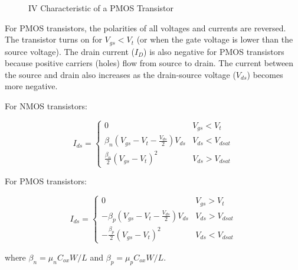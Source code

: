 \documentclass[fleqn]{article}
\begin{document}
\begin{enumerate}
		\begin{figure}[H]				
			\centerline{}
			\caption{IV Characteristic of a PMOS Transistor}
			\label{fig::iv_characteristics_pmos}
		\end{figure}
		
		For PMOS transistors, the polarities of all voltages and currents are reversed. The transistor turns on for $V_{gs} < V_t$  (or when the gate voltage is lower than the source voltage). The drain current ($I_D$) is also negative for PMOS transistors because positive carriers (holes) flow from source to drain. The current between the source and drain also increases as the drain-source voltage ($V_{ds}$) becomes more negative.
		
		For NMOS transistors:
		
		\begin{equation*}
			I_{ds} = \begin{cases}
				0 & V_{gs} < V_t \\
				\beta_n\left(V_{gs}-V_t-\frac{V_{ds}}{2}\right)V_{ds} & V_{ds} < V_{dsat} \\
				\frac{\beta_n}{2}(V_{gs}-V_t)^2 & V_{ds} > V_{dsat}
			\end{cases}
		\end{equation*}
		
		For PMOS transistors:
		
		\begin{equation*}
			I_{ds} = \begin{cases}
				0 & V_{gs} > V_t \\
				-\beta_p\left(V_{gs}-V_t-\frac{V_{ds}}{2}\right)V_{ds} & V_{ds} > V_{dsat} \\
				-\frac{\beta_p}{2}(V_{gs}-V_t)^2 & V_{ds} < V_{dsat}
			\end{cases}
		\end{equation*}
		
		where $\beta_n = \mu_nC_{ox}W/L$ and $\beta_p = \mu_pC_{ox}W/L$.
		

\end{enumerate}
\end{document}

